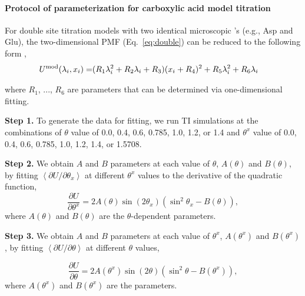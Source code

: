 \paragraph{Protocol of parameterization for carboxylic acid model titration}
For double site titration models with two identical microscopic \pka's (e.g., Asp and Glu), the two-dimensional PMF (Eq.~\ref{eq:double})
can be reduced to the following form \cite{Khandogin_Brooks_2005_Biophys.J.},
\begin{equation}
\begin{split}
U^{\rm mod}(\lambda_i,x_i) =
&(R_1 \lambda_i^2 + R_2 \lambda_i + R_3)(x_i + R_4)^2 + R_5 \lambda_i^2 + R_6 \lambda_i
\end{split}\label{eq:carboxyl}
\end{equation}

where $R_1$, ..., $R_6$ are parameters that can be determined via one-dimensional fitting.


\textbf{Step 1.} To generate the data for fitting,
we run TI simulations at the combinations of $\theta$ value of 0.0, 0.4, 0.6, 0.785, 1.0, 1.2, or 1.4
and $\theta^{x}$ value of 0.0, 0.4, 0.6, 0.785, 1.0, 1.2, 1.4, or 1.5708.

\textbf{Step 2.}
We obtain $A$ and $B$ parameters 
at each value of $\theta$, 
$A(\theta)$ and $B(\theta)$,
by fitting
$\left<\partial U/\partial\theta_{x}\right>$
at different $\theta^x$ values to
the derivative of the quadratic function,
\begin{equation}
    \frac{\partial U}{\partial\theta^{x}}=2A(\theta)\sin\left(2\theta_{x}\right)\left(\sin^{2}\theta_{x}-B(\theta)\right),
\end{equation}
where $A(\theta)$ and $B(\theta)$ are the $\theta$-dependent parameters.

\textbf{Step 3.}
We obtain $A$ and $B$ parameters 
at each value of $\theta^x$, $A(\theta^x)$ and $B(\theta^x)$,
by fitting
$\left<\partial U/\partial\theta\right>$
at different $\theta$ values,

\begin{equation}
    \frac{\partial U}{\partial\theta}=2A(\theta^x)\sin\left(2\theta\right)\left(\sin^{2}\theta-B(\theta^x)\right),
\end{equation}
where $A(\theta^x)$ and $B(\theta^x)$ are the parameters.


